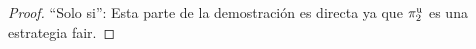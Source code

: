 \begin{proof}
\noindent ``Solo si'': Esta parte de la demostración es directa ya que $\pi^{\mathrm{u}}_{2}$ es una estrategia fair.
\qedhere
\end{proof} \\ 









